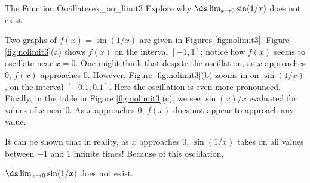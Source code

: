 %
%

\begin{example}{The Function Oscillates}{ex_no_limit3}{
	Explore why $\ds\lim_{x\to 0}\sin(1/x)$ does not exist.}%
	
\end{example}

\begin{solution}
{%
	Two graphs of $f(x) = \sin(1/x)$ are given in Figures \ref{fig:nolimit3}. Figure \ref{fig:nolimit3}(a) shows $f(x)$ on the interval $[-1,1]$; notice how $f(x)$ seems to oscillate near $x=0$. One might think that despite the oscillation, as $x$ approaches 0, $f(x)$ approaches 0. However, Figure \ref{fig:nolimit3}(b) zooms in on $\sin(1/x)$, on the interval $[-0.1,0.1]$. Here the oscillation is even more pronounced. Finally, in the table in Figure \ref{fig:nolimit3}(c), we see $\sin(x)/x$ evaluated for values of $x$ near 0. As $x$ approaches 0, $f(x)$ does not appear to approach any value. 
	
	It can be shown that in reality, as $x$ approaches 0, $\sin(1/x)$ takes on all values between $-1$ and 1 infinite times! Because of this oscillation,
	
	$\ds\lim_{x\to 0}\sin(1/x)$ does not exist.}\\
	
	
\end{solution}	



